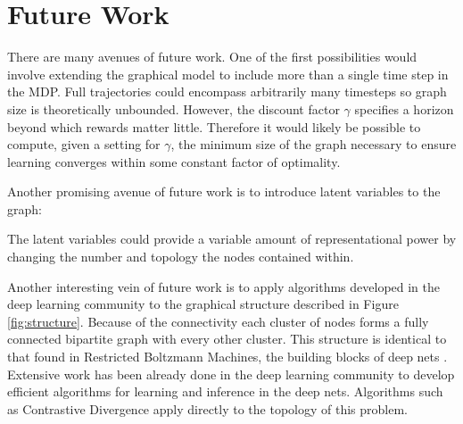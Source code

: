 \documentclass{article} %
\begin{document}
\section{Future Work}
There are many avenues of future work. One of the first possibilities would
involve extending the graphical model to include more than a single time step
in the MDP. Full trajectories could encompass arbitrarily many timesteps so
graph size is theoretically unbounded. However, the discount factor $\gamma$
specifies a horizon beyond which rewards matter little. Therefore it would
likely be possible to compute, given a setting for $\gamma$, the minimum size
of the graph necessary to ensure learning converges within some constant factor
of optimality. 

Another promising avenue of future work is to introduce latent variables to
the graph:


The latent variables could provide a variable amount of representational power
by changing the number and topology the nodes contained within. 

Another interesting vein of future work is to apply algorithms developed in the
deep learning community to the graphical structure described in Figure
\ref{fig:structure}. Because of the connectivity each cluster of nodes forms a
fully connected bipartite graph with every other cluster. This structure is
identical to that found in Restricted Boltzmann Machines, the building blocks
of deep nets \cite{ackley85}. Extensive work has been already done in the deep
learning community to develop efficient algorithms for learning and inference
in the deep nets. Algorithms such as Contrastive Divergence \cite{hinton02}
apply directly to the topology of this problem. 
\end{document}
